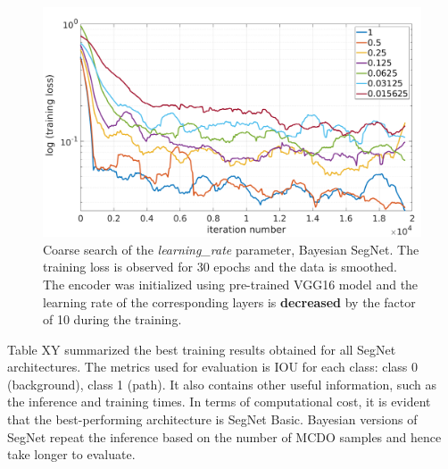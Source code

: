 \vspace{5mm}
\begin{figure}[h]
	\begin{center}
		\includegraphics*[width=14cm, keepaspectratio]{obr/bayes_full_rough_2.png}
	\end{center}
	\vspace{5mm}
	\caption{Coarse search of the \textit{learning\_rate} parameter, Bayesian SegNet. The training loss is observed for 30 epochs and the data is smoothed. The encoder was initialized using pre-trained VGG16 model and the learning rate of the corresponding layers is \textbf{decreased} by the factor of 10 during the training.} 
	\label{}
\end{figure}

Table XY summarized the best training results obtained for all SegNet architectures. The metrics used for evaluation is IOU for each class: class 0 (background), class 1 (path). It also contains other useful information, such as the inference and training times. In terms of computational cost, it is evident that the best-performing architecture is SegNet Basic. Bayesian versions of SegNet repeat the inference based on the number of MCDO samples and hence take longer to evaluate. 

